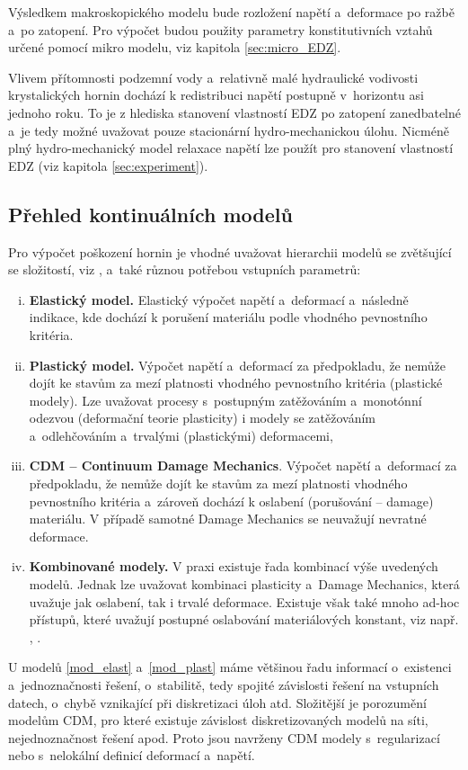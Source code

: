 \documentclass{article}
\begin{document}
Výsledkem makroskopického modelu bude rozložení napětí a~deformace po ražbě a~po zatopení. Pro výpočet budou použity 
parametry konstitutivních vztahů určené pomocí mikro modelu, viz kapitola \ref{sec:micro_EDZ}. 

Vlivem přítomnosti podzemní vody a~relativně malé hydraulické vodivosti krystalických hornin dochází k redistribuci napětí 
postupně v~horizontu asi jednoho roku. To je z hlediska stanovení vlastností EDZ po zatopení zanedbatelné a~je tedy možné uvažovat 
pouze stacionární hydro-mechanickou úlohu. Nicméně plný hydro-mechanický model relaxace napětí lze použít pro stanovení vlastností EDZ (viz kapitola \ref{sec:experiment}).







\subsection{Přehled kontinuálních modelů} 

Pro výpočet poškození hornin je vhodné uvažovat hierarchii modelů se zvětšující se složitostí, viz \cite{Blaheta2013a}, a~také různou potřebou vstupních parametrů:
\begin{enumerate}[(i)]
	\item \label{mod_elast} {\bf Elastický model.} Elastický výpočet napětí a~deformací a~následně indikace, kde dochází k porušení materiálu podle vhodného pevnostního kritéria.
	\item \label{mod_plast} {\bf Plastický model.} Výpočet napětí a~deformací za předpokladu, že nemůže dojít ke stavům za mezí platnosti vhodného pevnostního kritéria (plastické modely). Lze uvažovat procesy s~postupným zatěžováním a~monotónní odezvou (deformační teorie plasticity) i modely se zatěžováním a~odlehčováním a~trvalými (plastickými) deformacemi,
	\item \label{mod_damage} {\bf CDM -- Continuum Damage Mechanics}. Výpočet napětí a~deformací za předpokladu, že nemůže dojít ke stavům za mezí platnosti vhodného pevnostního kritéria a~zároveň dochází k oslabení (porušování --  damage) materiálu. V případě samotné Damage Mechanics se neuvažují nevratné deformace.
	\item \label{mod_irev_cdm} {\bf Kombinované modely.} V praxi existuje řada kombinací výše uvedených modelů. Jednak lze uvažovat kombinaci plasticity a~Damage Mechanics, která uvažuje jak oslabení, tak i trvalé deformace. Existuje však také mnoho ad-hoc přístupů, které uvažují postupné oslabování materiálových konstant, viz např. \cite{Perras2016}, \cite{Carranza-Torres1999}.
\end{enumerate}
U modelů \eqref{mod_elast} a~\eqref{mod_plast} máme většinou řadu informací o~existenci a~jednoznačnosti
řešení, o~stabilitě, tedy spojité závislosti řešení na vstupních datech, o~chybě vznikající  při  diskretizaci  úloh  atd.  Složitější je porozumění  modelům CDM, pro které existuje závislost diskretizovaných  modelů na  síti, nejednoznačnost řešení  apod. Proto jsou navrženy CDM modely s~regularizací nebo s~nelokální definicí deformací a~napětí. 
\end{document}
